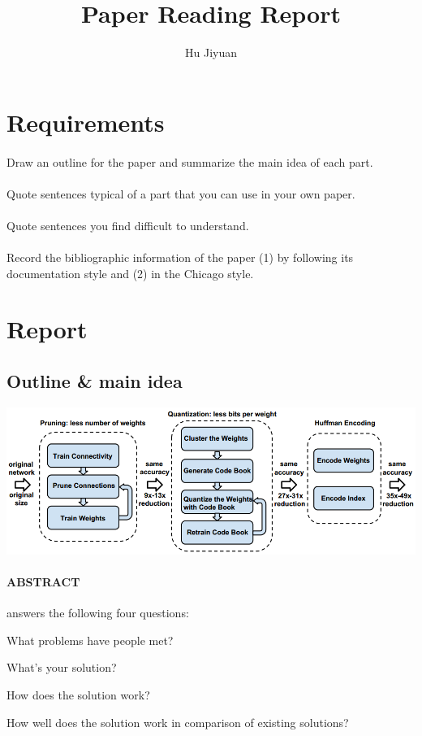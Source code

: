\documentclass{article}
\author{Hu Jiyuan}
\title{Paper Reading Report}
\begin{document}
\maketitle

\section{Requirements}

\paragraph{} Draw an outline for the paper and summarize the main idea of each part.
\paragraph{} Quote sentences typical of a part that you can use in your own paper.
\paragraph{} Quote sentences you find difficult to understand.
\paragraph{} Record the bibliographic information of the paper 
(1) by following its documentation style and 
(2) in the Chicago style.

\section{Report}

\subsection{Outline \& main idea}

\includegraphics[width=\textwidth]{graphics/part1-overview.png}  
\paragraph{ABSTRACT} answers the following four questions: 
    \par What problems have people met?
    \par What's your solution?
    \par How does the solution work?
    \par How well does the solution work in comparison of existing solutions?
\end{document}
